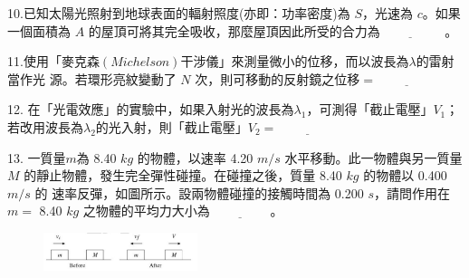 \documentclass[cn,10pt,math=newtx,chinesefont=founder,device=ig]{elegantbook}
\begin{document}
\newpage


\begin{example}
   10.已知太陽光照射到地球表面的輻射照度(亦即：功率密度)為 $S$，光速為 $c$。如果一個面積為 $A$
的屋頂可將其完全吸收，那麼屋頂因此所受的合力為$\underline{\hspace{2cm}}$ 。\\
    \rightline{[桃園聯招教甄109]}
\end{example}
\begin{solution}
    
\end{solution}

\newpage


\begin{example}
   11.使用「麥克森$(Michelson)$干涉儀」來測量微小的位移，而以波長為$\lambda$的雷射當作光
源。若環形亮紋變動了 $N$ 次，則可移動的反射鏡之位移$=\underline{\hspace{2cm}}$\\
    \rightline{[桃園聯招教甄109]}
\end{example}
\begin{solution}
    
\end{solution}

\newpage


\begin{example}
   12. 在「光電效應」的實驗中，如果入射光的波長為$\lambda_1$，可測得「截止電壓」$V_1$； 若改用波長為$\lambda_2$的光入射，則「截止電壓」$V_2 =\underline{\hspace{2cm}}$\\
    \rightline{[桃園聯招教甄109]}
\end{example}
\begin{solution}
    
\end{solution}

\newpage


\begin{example}
   13. 一質量$m$為 8.40 $kg$ 的物體，以速率 4.20 $m/s$ 水平移動。此一物體與另一質量 $M$
的靜止物體，發生完全彈性碰撞。在碰撞之後，質量 8.40 $kg$ 的物體以 0.400 $m/s$ 的
速率反彈，如圖所示。設兩物體碰撞的接觸時間為 0.200 $s$，請問作用在 $m =$ 8.40 $kg$
之物體的平均力大小為$\underline{\hspace{2cm}}$。\\
    \rightline{[桃園聯招教甄109]}
\end{example}
\begin{solution}
    
\end{solution}
\begin{figure}[htbp]
    \flushright
    \includegraphics[width=0.4\textwidth]{image/109桃聯13.png}
  \end{figure}
\newpage
\end{document}
